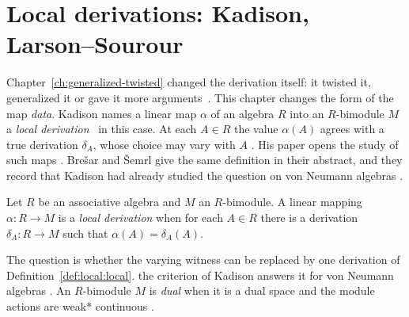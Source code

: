 \section{Local derivations: Kadison, Larson--Sourour}\label{sec:local-characterizations:local}

Chapter~\ref{ch:generalized-twisted} changed the derivation itself: it twisted
it, generalized it or gave it more arguments~\cite[p.~483]{BresarSemrl1993}. This chapter changes the form of
the map \emph{data}. Kadison names a linear map $\alpha$ of an algebra $R$
into an $R$-bimodule $M$ a \emph{local derivation}~\cite[p.~494]{Kadison1990Local}
in this case. At each $A\in R$ the value $\alpha(A)$
agrees with a true derivation $\delta_A$, whose choice may vary with $A$
\cite[p.~494]{Kadison1990Local}. His paper opens the study of such maps
\cite[p.~494]{Kadison1990Local}. Bre\v{s}ar and \v{S}emrl give the same
definition in their abstract, and they record that Kadison had already studied
the question on von Neumann algebras \cite[p.~483]{BresarSemrl1993}.

\begin{definition}\label{def:local:local}
Let $R$ be an associative algebra and $M$ an $R$-bimodule. A linear mapping
$\alpha\colon R\to M$ is a \emph{local derivation} when for each $A\in R$
there is a derivation $\delta_{A}\colon R\to M$ such that
$\alpha(A)=\delta_{A}(A)$.
\end{definition}

The question is whether the varying witness can be replaced by one derivation
of Definition~\ref{def:local:local}. the criterion of Kadison answers it for
von Neumann algebras \cite[p.~494]{Kadison1990Local}. An $R$-bimodule $M$ is
\emph{dual} when it is a dual space and the module actions are weak*
continuous \cite[p.~494]{Kadison1990Local}.

